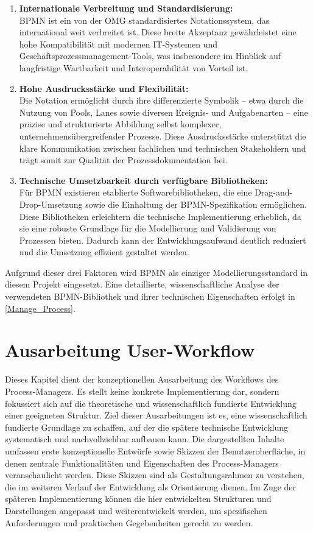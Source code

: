 \begin{enumerate}
    \item \textbf{Internationale Verbreitung und Standardisierung:} \\
    \ac{BPMN} ist ein von der \ac{OMG} standardisiertes Notationssystem, das international weit verbreitet ist. Diese breite Akzeptanz gewährleistet eine hohe Kompatibilität mit modernen \ac{IT}-Systemen und Geschäftsprozessmanagement-Tools, was insbesondere im Hinblick auf langfristige Wartbarkeit und Interoperabilität von Vorteil ist.
    \item \textbf{Hohe Ausdrucksstärke und Flexibilität:} \\
    Die Notation ermöglicht durch ihre differenzierte Symbolik -- etwa durch die Nutzung von Pools, Lanes sowie diversen Ereignis- und Aufgabenarten -- eine präzise und strukturierte Abbildung selbst komplexer, unternehmensübergreifender Prozesse. Diese Ausdrucksstärke unterstützt die klare Kommunikation zwischen fachlichen und technischen Stakeholdern und trägt somit zur Qualität der Prozessdokumentation bei.
    \item \textbf{Technische Umsetzbarkeit durch verfügbare Bibliotheken:} \\
    Für \ac{BPMN} existieren etablierte Softwarebibliotheken, die eine Drag-and-Drop-Umsetzung sowie die Einhaltung der BPMN-Spezifikation ermöglichen. Diese Bibliotheken erleichtern die technische Implementierung erheblich, da sie eine robuste Grundlage für die Modellierung und Validierung von Prozessen bieten. Dadurch kann der Entwicklungsaufwand deutlich reduziert und die Umsetzung effizient gestaltet werden.
\end{enumerate}
 
Aufgrund dieser drei Faktoren wird \ac{BPMN} als einziger Modellierungsstandard in diesem Projekt eingesetzt. Eine detaillierte, wissenschaftliche Analyse der verwendeten BPMN-Bibliothek und ihrer technischen Eigenschaften erfolgt in \autoref{Manage_Process}.


\newpage
\section{Ausarbeitung User-Workflow}
Dieses Kapitel dient der konzeptionellen Ausarbeitung des Workflows des Process-Managers. Es stellt keine konkrete Implementierung dar, sondern fokussiert sich auf die theoretische und wissenschaftlich fundierte Entwicklung einer geeigneten Struktur. Ziel dieser Ausarbeitungen ist es, eine wissenschaftlich fundierte Grundlage zu schaffen, auf der die spätere technische Entwicklung systematisch und nachvollziehbar aufbauen kann.
Die dargestellten Inhalte umfassen erste konzeptionelle Entwürfe sowie Skizzen der Benutzeroberfläche, in denen zentrale Funktionalitäten und Eigenschaften des Process-Managers veranschaulicht werden. Diese Skizzen sind als Gestaltungsrahmen zu verstehen, die im weiteren Verlauf der Entwicklung als Orientierung dienen.
Im Zuge der späteren Implementierung können die hier entwickelten Strukturen und Darstellungen angepasst und weiterentwickelt werden, um spezifischen Anforderungen und praktischen Gegebenheiten gerecht zu werden.
